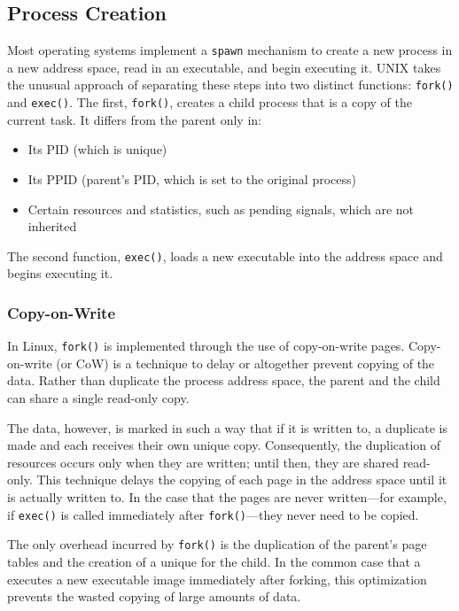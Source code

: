 \subsection{Process Creation}\label{subsec:Process_Creation}
Most operating systems implement a \texttt{spawn} mechanism to create a new process in a new address space, read in an executable, and begin executing it.
UNIX takes the unusual approach of separating these steps into two distinct functions: \texttt{fork()} and \texttt{exec()}.
The first, \texttt{fork()}, creates a child process that is a copy of the current task.
It differs from the parent only in:
\begin{itemize}[noitemsep]
\item Its PID (which is unique)
\item Its PPID (parent’s PID, which is set to the original process)
\item Certain resources and statistics, such as pending signals, which are not inherited
\end{itemize}

The second function, \texttt{exec()}, loads a new executable into the address space and begins executing it.

\subsubsection{Copy-on-Write}\label{subsubsec:Process_Copy_on_Write}
In Linux, \texttt{fork()} is implemented through the use of copy-on-write pages.
Copy-on-write (or CoW) is a technique to delay or altogether prevent copying of the data.
Rather than duplicate the process address space, the parent and the child can share a single read-only copy.

The data, however, is marked in such a way that if it is written to, a duplicate is made and each  receives their own unique copy.
Consequently, the duplication of resources occurs only when they are written; until then, they are shared read-only.
This technique delays the copying of each page in the address space until it is actually written to.
In the case that the pages are never written—for example, if \texttt{exec()} is called immediately after \texttt{fork()}—they never need to be copied.

The only overhead incurred by \texttt{fork()} is the duplication of the parent’s page tables and the creation of a unique  for the child.
In the common case that a  executes a new executable image immediately after forking, this optimization prevents the wasted copying of large amounts of data.

